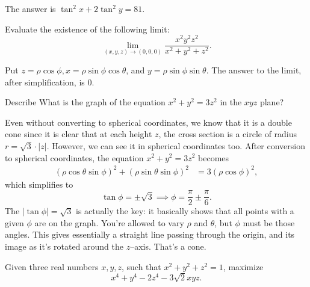 \documentclass[12pt,a4paper]{memoir}
\theoremstyle{definition}
\begin{document}
\begin{solution}
	The answer is $\tan^2 x+2\tan^2 y = \boxed{81}$.
\end{solution}


\begin{question}[name={2018 Deerfield Math Competition (Extra)}]
	Evaluate the existence of the following limit: $$\lim_{(x,y,z)\to(0,0,0)}\dfrac{x^2y^2z^2}{x^2+y^2+z^2}.$$
\end{question}

\begin{solution}
	Put $z = \rho \cos \phi,	x = \rho \sin \phi \cos \theta$, and $y = \rho \sin \phi \sin \theta$. The answer to the limit, after simplification, is $0$.
\end{solution}



\begin{question} 
	Describe What is the graph of the equation $x^2+y^2 = 3z^2$ in the $xyz$ plane?
\end{question}


\begin{solution}[name={Solution by Rchokler}]
	Even without converting to spherical coordinates, we know that it is a double cone since it is clear that at each height $z$, the cross section is a circle of radius $r=\sqrt{3}\cdot|z|$. However, we can see it in spherical coordinates too. After conversion to spherical coordinates, the equation $x^2+y^2 = 3z^2$ becomes
	\begin{align*}
		(\rho\cos\theta\sin\phi)^2+(\rho\sin\theta\sin\phi)^2 &= 3(\rho\cos\phi)^2,
	\end{align*}
	which simplifies to 
	\[\tan\phi=\pm\sqrt{3}\implies\phi=\boxed{\frac{\pi}{2}\pm\frac{\pi}{6}}.\]
	The $|\tan \phi| = \sqrt{3}$ is actually the key: it basically shows that all points with a given $\phi$ are on the graph. You're allowed to vary $\rho$ and $\theta$, but $\phi$ must be those angles. This gives essentially a straight line passing through the origin, and its image as it's rotated around the $z$--axis. That's a cone.
\end{solution}



\begin{question}[name={Maximization on Sphere by WeakMathemetician}]
	Given three real numbers $x,y,z$, such that $x^2+y^2+z^2=1$, maximize $$x^4+y^4-2z^4 - 3 \sqrt{2} xyz.$$
\end{question}
\end{document}
